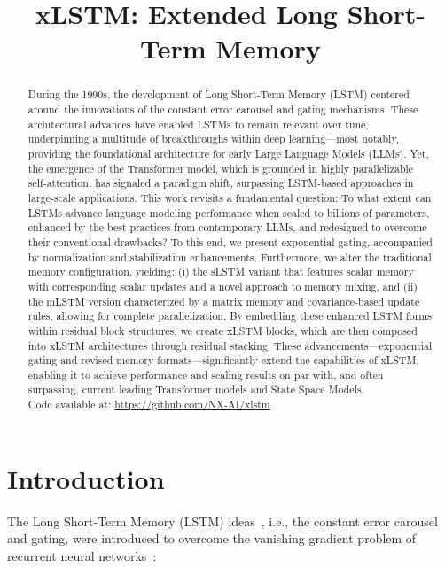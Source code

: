 \title{xLSTM: Extended Long Short-Term Memory}

\begin{abstract}
During the 1990s, the development of Long Short-Term Memory (LSTM) centered around the innovations of the constant error carousel and gating mechanisms. These architectural advances have enabled LSTMs to remain relevant over time, underpinning a multitude of breakthroughs within deep learning—most notably, providing the foundational architecture for early Large Language Models (LLMs). Yet, the emergence of the Transformer model, which is grounded in highly parallelizable self-attention, has signaled a paradigm shift, surpassing LSTM-based approaches in large-scale applications. This work revisits a fundamental question: To what extent can LSTMs advance language modeling performance when scaled to billions of parameters, enhanced by the best practices from contemporary LLMs, and redesigned to overcome their conventional drawbacks? To this end, we present exponential gating, accompanied by normalization and stabilization enhancements. Furthermore, we alter the traditional memory configuration, yielding: (i) the sLSTM variant that features scalar memory with corresponding scalar updates and a novel approach to memory mixing, and (ii) the mLSTM version characterized by a matrix memory and covariance-based update rules, allowing for complete parallelization. By embedding these enhanced LSTM forms within residual block structures, we create xLSTM blocks, which are then composed into xLSTM architectures through residual stacking. These advancements—exponential gating and revised memory formats—significantly extend the capabilities of xLSTM, enabling it to achieve performance and scaling results on par with, and often surpassing, current leading Transformer models and State Space Models.\\
Code available at: \url{https://github.com/NX-AI/xlstm}
\end{abstract}

\section{Introduction}
\label{sec:intro}

The Long Short-Term Memory (LSTM) ideas~\citep{Hochreiter:91,Hochreiter:97nips,Hochreiter:97}, i.e., the constant error carousel and gating, were introduced to overcome the vanishing gradient problem of recurrent neural networks~\citep{Hochreiter:91,Hochreiter:00book}:

